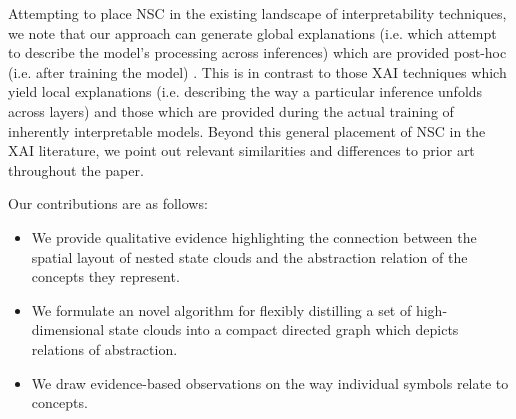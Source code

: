 Attempting to place NSC in the existing landscape of interpretability techniques, we note that our approach can generate global explanations (i.e. which attempt to describe the model's processing across inferences) which are provided post-hoc (i.e. after training the model) \citep{danilevsky_survey_nodate}. This is in contrast to those XAI techniques which yield local explanations (i.e. describing the way a particular inference unfolds across layers) and those which are provided during the actual training of inherently interpretable models. Beyond this general placement of NSC in the XAI literature, we point out relevant similarities and differences to prior art throughout the paper.

Our contributions are as follows:

\begin{itemize}
    \item We provide qualitative evidence highlighting the connection between the spatial layout of nested state clouds and the abstraction relation of the concepts they represent.
    \item We formulate an novel algorithm for flexibly distilling a set of high-dimensional state clouds into a compact directed graph which depicts relations of abstraction.
    \item We draw evidence-based observations on the way individual symbols relate to concepts.
\end{itemize}